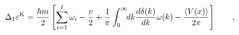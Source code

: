 \begin{equation}
\Delta_1\varepsilon^{\rm K}=\frac{\hbar
m}{2}\left[\sum_{i=1}^{l}\omega_i-\frac{v}{2}+\frac{1}{\pi}\int_0^\infty
\!\! dk
\frac{d\delta(k)}{dk}\omega(k)-\frac{\left<V(x)\right>}{2\pi}\right]\qquad
, \label{onel}
\end{equation}


